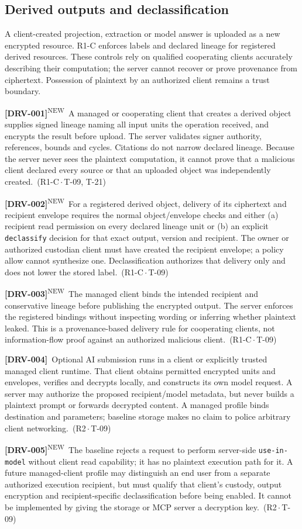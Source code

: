 \documentclass[11pt,a4paper]{article}
\newcommand{\code}[1]{{\small\nolinkurl{#1}}}
\newcommand{\reqtag}[2]{{\footnotesize\color{accent}(#1\,$\cdot$\,#2)}}
\newcommand{\req}[4]{\par\noindent\hypertarget{req:#1}{\textbf{[#1]}}\ #4\ \reqtag{#2}{#3}\par}
\newcommand{\reqn}[4]{\par\noindent\hypertarget{req:#1}{\textbf{[#1]}}\textsuperscript{\color{accent}\tiny NEW}\ #4\ \reqtag{#2}{#3}\par}
\begin{document}
\subsection{Derived outputs and declassification}\label{sec:derived}
A client-created projection, extraction or model answer is uploaded as a new encrypted resource. R1-C enforces labels and declared lineage for registered derived resources. These controls rely on qualified cooperating clients accurately describing their computation; the server cannot recover or prove provenance from ciphertext. Possession of plaintext by an authorized client remains a trust boundary.
\reqn{DRV-001}{R1-C}{T-09, T-21}{A managed or cooperating client that creates a derived object supplies signed lineage naming all input units the operation received, and encrypts the result before upload. The server validates signer authority, references, bounds and cycles. Citations do not narrow declared lineage. Because the server never sees the plaintext computation, it cannot prove that a malicious client declared every source or that an uploaded object was independently created.}
\reqn{DRV-002}{R1-C}{T-09}{For a registered derived object, delivery of its ciphertext and recipient envelope requires the normal object/envelope checks and either (a) recipient read permission on every declared lineage unit or (b) an explicit \code{declassify} decision for that exact output, version and recipient. The owner or authorized custodian client must have created the recipient envelope; a policy allow cannot synthesize one. Declassification authorizes that delivery only and does not lower the stored label.}
\reqn{DRV-003}{R1-C}{T-09}{The managed client binds the intended recipient and conservative lineage before publishing the encrypted output. The server enforces the registered bindings without inspecting wording or inferring whether plaintext leaked. This is a provenance-based delivery rule for cooperating clients, not information-flow proof against an authorized malicious client.}
\req{DRV-004}{R2}{T-09}{Optional AI submission runs in a client or explicitly trusted managed client runtime. That client obtains permitted encrypted units and envelopes, verifies and decrypts locally, and constructs its own model request. A server may authorize the proposed recipient/model metadata, but never builds a plaintext prompt or forwards decrypted content. A managed profile binds destination and parameters; baseline storage makes no claim to police arbitrary client networking.}
\reqn{DRV-005}{R2}{T-09}{The baseline rejects a request to perform server-side \code{use-in-model} without client read capability; it has no plaintext execution path for it. A future managed-client profile may distinguish an end user from a separate authorized execution recipient, but must qualify that client's custody, output encryption and recipient-specific declassification before being enabled. It cannot be implemented by giving the storage or MCP server a decryption key.}
\end{document}
